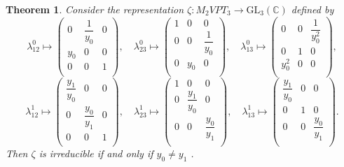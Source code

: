 \documentclass[preprint]{elsarticle}
\newtheorem{theorem}{Theorem}[section]
\begin{document}
\begin{theorem}
Consider the representation $\zeta: M_2VPT_3\longrightarrow \mathrm{GL}_{3}(\mathbb{C}) $  defined by
$$\lambda^0_{12}\mapsto\left(
\begin{array}{ccc}
 0 & \dfrac{1}{y_0} & 0 \\
 y_0 & 0 & 0 \\
 0 & 0 & 1 \\
\end{array}
\right), \quad
\lambda^0_{23}\mapsto\left(
\begin{array}{ccc}
 1 & 0 & 0 \\
 0 & 0 & \dfrac{1}{y_0} \\
 0 & y_0 & 0 \\
\end{array}
\right), \quad
\lambda^0_{13}\mapsto\left(
\begin{array}{ccc}
 0 & 0 & \dfrac{1}{y_0^2} \\
 0 & 1 & 0 \\
 y_0^2 & 0 & 0 \\
\end{array}
\right),$$
$$\lambda^1_{12}\mapsto\left(
\begin{array}{ccc}
 \dfrac{y_1}{y_0} & 0 & 0 \\
 0 & \dfrac{y_0}{y_1} & 0 \\
 0 & 0 & 1 \\
 
\end{array}
\right),\quad
\lambda^1_{23}\mapsto\left(
\begin{array}{ccc}
 1 & 0 & 0 \\
 0 & \dfrac{y_1}{y_0} & 0 \\
 0 & 0 & \dfrac{y_0}{y_1} \\
\end{array}
\right),\quad
\lambda^1_{13}\mapsto\left(
\begin{array}{ccc}
 \dfrac{y_1}{y_0} & 0 & 0 \\
 0 & 1 & 0 \\
 0 & 0 & \dfrac{y_0}{y_1} \\
\end{array}
\right).$$
Then $\zeta$ is irreducible if and only if $y_0\neq y_1$ .
    
\end{theorem}
\end{document}
